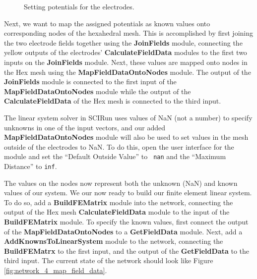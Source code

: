 \documentclass[fleqn,11pt,openany]{book}
\begin{document}
\begin{figure}
\caption{Setting potentials for the
electrodes.}\label{fig:network_3_calc_field_data}
\end{figure}

Next, we want to map the assigned potentials as known values onto
corresponding nodes of the hexahedral mesh. This is accomplished by
first joining the two electrode fields together using the {\bf
JoinFields} module, connecting the yellow outputs of the electrodes'
{\bf CalculateFieldData} modules to the first two inputs on the {\bf
JoinFields} module. Next, these values are mapped onto nodes in the
Hex mesh using the {\bf MapFieldDataOntoNodes} module. The output of
the {\bf JoinFields} module is connected to the first input of the
{\bf MapFieldDataOntoNodes} module while the output of the {\bf
CalculateFieldData} of the Hex mesh is connected to the third input.

The linear system solver in SCIRun uses values of NaN (not a number)
to specify unknowns in one of the input vectors, and our added {\bf
MapFieldDataOntoNodes} module will also be used to set values in the
mesh outside of the electrodes to NaN. To do this, open the user
interface for the module and set the ``Default Outside Value'' to {\tt
nan} and the ``Maximum Distance'' to {\tt inf}.

The values on the nodes now represent both the unknown (NaN) and known
values of our system. We our now ready to build our finite element
linear system. To do so, add a {\bf BuildFEMatrix} module into the
network, connecting the output of the Hex mesh {\bf
CalculateFieldData} module to the input of the {\bf BuildFEMatrix}
module. To specify the known values, first connect the output of the
{\bf MapFieldDataOntoNodes} to a {\bf GetFieldData} module. Next, add
a {\bf AddKnownsToLinearSystem} module to the network, connecting the
{\bf BuildFEMatrx} to the first input, and the output of the {\bf
GetFieldData} to the third input. The current state of the network
should look like Figure \ref{fig:network_4_map_field_data}.
\end{document}

